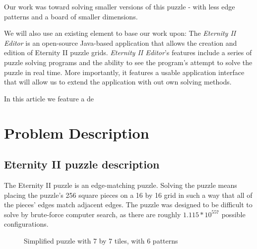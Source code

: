 \documentclass{llncs}
\begin{document}
Our work was toward solving smaller versions of this puzzle - with less edge patterns and a board of smaller dimensions.

We will also use an existing element to base our work upon: The \textit{Eternity II Editor} is an open-source Java-based application that allows the creation and edition of Eternity II puzzle grids. \textit{Eternity II Editor}'s features include a series of puzzle solving programs and the ability to see the program's attempt to solve the puzzle in real time. More importantly, it features a usable application interface that will allow us to extend the application with out own solving methods.

In this article we feature a de

\section{Problem Description}\label{sec:problem_description}

\subsection{Eternity II puzzle description}\label{sec:puzzle_description}

The Eternity II puzzle is an edge-matching puzzle. Solving the puzzle means placing the puzzle's 256 square pieces on a 16 by 16 grid in such a way that all of the pieces' edges match adjacent edges. The puzzle was designed to be difficult to solve by brute-force computer search, as there are roughly $1.115 * 10 ^ {557}$ possible configurations.

\begin{figure}[H]
  \centering
  \hspace{5mm}
  \caption{Simplified puzzle with 7 by 7 tiles, with 6 patterns}
  \label{fig:7x7_example}
\end{figure}
\end{document}
